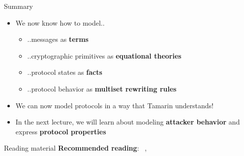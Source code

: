 \documentclass[11pt,aspectratio=169]{beamer}
\begin{document}
\begin{frame}[fragile]{Summary}
    \begin{itemize}
        \item We now know how to model..
        \begin{itemize}
            \item ..messages as \textbf{terms}
            \item ..cryptographic primitives as \textbf{equational theories}
            \item ..protocol states as \textbf{facts}
            \item ..protocol behavior as \textbf{multiset rewriting rules}
        \end{itemize}
        \item We can now model protocols in a way that Tamarin understands!
        \item In the next lecture, we will learn about modeling
              \textbf{attacker behavior} and express
              \textbf{protocol properties}
    \end{itemize}
\end{frame}

\begin{frame}[fragile]{Reading material}
    \textbf{Recommended reading}:
        ~\cite[Ch. 3.1.5--3.2.1]{tamarin-book},
        ~\cite[Ch. 3]{cortier2014tutorial}
    \printbibliography[heading=none]
\end{frame}
\end{document}
